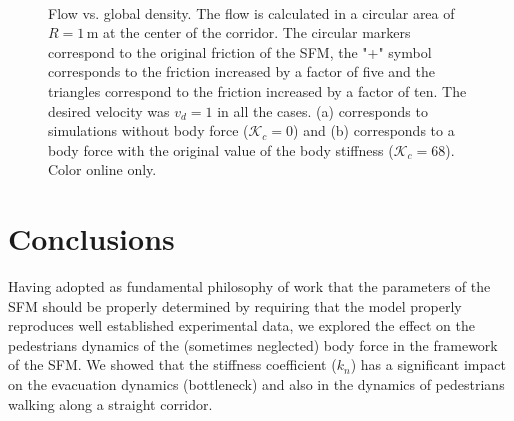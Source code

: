 \documentclass[preprint,12pt]{elsarticle}
\begin{document}
\begin{figure}[!htbp]
\centering
{}\ 
\\
\caption[width=0.47\columnwidth]{Flow vs. global density. The flow is calculated
in a circular area of $R=1\,$m at the center of the corridor. The circular 
markers correspond to the original friction of the SFM, the "+" symbol 
corresponds to the friction increased by a factor of five and the triangles 
correspond to the friction increased by a factor of ten. The desired velocity 
was $v_d=1$ in all the cases. (a) corresponds to simulations without body force 
($\mathcal{K}_c =$0) and (b) corresponds to a body force with the original value
 of the body stiffness ($\mathcal{K}_c =$68). Color online only.}
\label{flow_density}
\end{figure}



\section{\label{conclusions}Conclusions}


Having adopted as fundamental philosophy of work that the parameters of the SFM
should be properly determined by requiring that the model properly reproduces
well established experimental data, we explored the effect on the pedestrians
dynamics of the (sometimes neglected) body force in the framework of the SFM. We
showed that the stiffness coefficient ($k_n$) has a significant impact on the
evacuation dynamics (bottleneck) and also in the dynamics of pedestrians walking
along a straight corridor.\\
\end{document}
